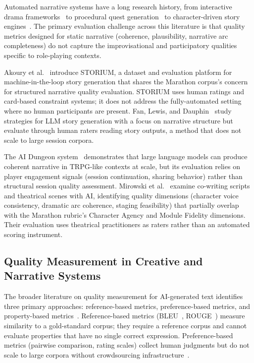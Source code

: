 Automated narrative systems have a long research history, from interactive drama
frameworks~\cite{riedl2016} to procedural quest generation~\cite{dormans2010} to
character-driven story engines~\cite{ammanabrolu2021}. The primary evaluation
challenge across this literature is that quality metrics designed for static narrative
(coherence, plausibility, narrative arc completeness) do not capture the improvisational
and participatory qualities specific to role-playing contexts.

Akoury et al.~\cite{akoury2020} introduce STORIUM, a dataset and evaluation platform
for machine-in-the-loop story generation that shares the Marathon corpus's concern for
structured narrative quality evaluation. STORIUM uses human ratings and card-based
constraint systems; it does not address the fully-automated setting where no human
participants are present. Fan, Lewis, and Dauphin~\cite{fan2019} study strategies for
LLM story generation with a focus on narrative structure but evaluate through human
raters reading story outputs, a method that does not scale to large session corpora.

The AI Dungeon system~\cite{aidungeon2019} demonstrates that large language models
can produce coherent narrative in TRPG-like contexts at scale, but its evaluation
relies on player engagement signals (session continuation, sharing behavior) rather
than structural session quality assessment. Mirowski et al.~\cite{mirowski2023}
examine co-writing scripts and theatrical scenes with AI, identifying quality
dimensions (character voice consistency, dramatic arc coherence, staging feasibility)
that partially overlap with the Marathon rubric's Character Agency and Module Fidelity
dimensions. Their evaluation uses theatrical practitioners as raters rather than an
automated scoring instrument.

\subsection{Quality Measurement in Creative and Narrative Systems}

The broader literature on quality measurement for AI-generated text identifies three
primary approaches: reference-based metrics, preference-based metrics, and
property-based metrics~\cite{celikyilmaz2020}. Reference-based metrics (BLEU~\cite{papineni2002bleu},
ROUGE~\cite{lin2004rouge}) measure similarity to a gold-standard corpus; they require
a reference corpus and cannot evaluate properties that have no single correct expression.
Preference-based metrics (pairwise comparison, rating scales) collect human judgments
but do not scale to large corpora without crowdsourcing infrastructure~\cite{akoury2020}.

